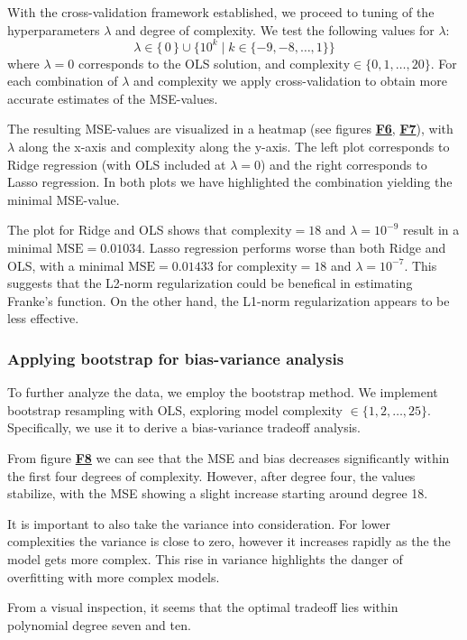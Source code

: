 \documentclass{article}
\begin{document}
\begin{multicols}{2}
With the cross-validation framework established, we proceed to tuning of the hyperparameters $\lambda$ and degree of complexity. We test the following values for $\lambda$: 
$$\lambda \in \{\,0\,\} \cup \{ 10^{k} \;\big|\; k \in \{-9, -8, \ldots, 1\} \}$$
where $\lambda = 0$ corresponds to the OLS solution, and 
$\text{complexity} \in \{0, 1, \ldots, 20\}$.
For each combination of $\lambda$ and complexity we apply cross-validation to obtain more accurate estimates of the MSE-values. 

The resulting MSE-values are visualized in a heatmap (see figures \hyperref[fig:F6]{\textbf{F6}}, \hyperref[fig:F7]{\textbf{F7}}), with $\lambda$ along the x-axis and complexity along the y-axis. The left plot corresponds to Ridge regression (with OLS included at $\lambda = 0$) and the right corresponds to Lasso regression. In both plots we have highlighted the combination yielding the minimal MSE-value. 

The plot for Ridge and OLS shows that $\text{complexity} = 18$ and $\lambda = 10^{-9}$ result in a minimal $\text{MSE} = 0.01034$. Lasso regression performs worse than both Ridge and OLS, with a minimal $\text{MSE} = 0.01433$ for $\text{complexity} = 18$ and $\lambda = 10^{-7}$. This suggests that the L2-norm regularization could be benefical in estimating Franke's function. On the other hand, the L1-norm regularization appears to be less effective.

\subsubsection*{Applying bootstrap for bias-variance analysis}
To further analyze the data, we employ the bootstrap method. We implement bootstrap resampling with OLS, exploring model complexity $\in \{1, 2, \ldots, 25\}$. Specifically, we use it to derive a bias-variance tradeoff analysis. 

From figure \hyperref[fig:F8]{\textbf{F8}} we can see that the MSE and bias decreases significantly within the first four degrees of complexity. However, after degree four, the values stabilize, with the MSE showing a slight increase starting around degree 18.

It is important to also take the variance into consideration. For lower complexities the variance is close to zero, however it increases rapidly as the the model gets more complex. This rise in variance highlights the danger of overfitting with more complex models. 

From a visual inspection, it seems that the optimal tradeoff lies within polynomial degree seven and ten.


\end{multicols}
\end{document}
